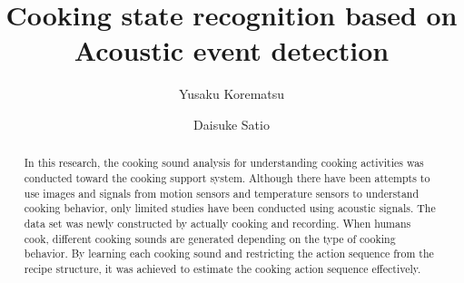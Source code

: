 \documentclass[sigconf,anonymous]{acmart}
\begin{document}
\title{Cooking state recognition based on \\ Acoustic event detection}

\author{Yusaku Korematsu}
\author{Daisuke Satio}
\authornotemark[1]

%

%
\begin{abstract}
  In this research, the cooking sound analysis for understanding cooking activities was conducted toward the cooking support system.
  Although there have been attempts to use images and signals from motion sensors and temperature sensors to understand cooking behavior, only limited studies have been conducted using acoustic signals.
  The data set was newly constructed by actually cooking and recording.
  When humans cook, different cooking sounds are generated depending on the type of cooking behavior. By learning each cooking sound and restricting the action sequence from the recipe structure, it was achieved to estimate the cooking action sequence effectively.
\end{abstract}
\end{document}
